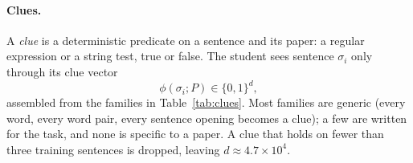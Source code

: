 \documentclass[10pt]{article}
\begin{document}
\paragraph{Clues.}
A \emph{clue} is a deterministic predicate on a sentence and its paper: a regular expression or a string test, true or false. The student sees sentence $\sigma_i$ only through its clue vector
%
\begin{equation}
  \phi(\sigma_i;P)\in\{0,1\}^{d},
\end{equation}
%
assembled from the families in Table~\ref{tab:clues}. Most families are generic (every word, every word pair, every sentence opening becomes a clue); a few are written for the task, and none is specific to a paper. A clue that holds on fewer than three training sentences is dropped, leaving $d\approx4.7\times10^4$.
\end{document}
